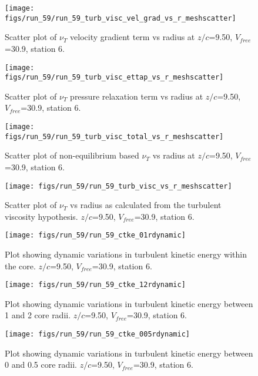 \begin{figure}[H]
\centering
\texttt{[image: figs/run\_59/run\_59\_turb\_visc\_vel\_grad\_vs\_r\_meshscatter]}
\caption{Scatter plot of $\nu_T$ velocity gradient term vs radius at $z/c$=9.50, $V_{free}$=30.9, station 6.}
\end{figure}


\begin{figure}[H]
\centering
\texttt{[image: figs/run\_59/run\_59\_turb\_visc\_ettap\_vs\_r\_meshscatter]}
\caption{Scatter plot of $\nu_T$ pressure relaxation term vs radius at $z/c$=9.50, $V_{free}$=30.9, station 6.}
\end{figure}


\begin{figure}[H]
\centering
\texttt{[image: figs/run\_59/run\_59\_turb\_visc\_total\_vs\_r\_meshscatter]}
\caption{Scatter plot of non-equilibrium based $\nu_T$ vs radius at $z/c$=9.50, $V_{free}$=30.9, station 6.}
\end{figure}


\begin{figure}[H]
\centering
\texttt{[image: figs/run\_59/run\_59\_turb\_visc\_vs\_r\_meshscatter]}
\caption{Scatter plot of $\nu_T$ vs radius as calculated from the turbulent viscosity hypothesis. $z/c$=9.50, $V_{free}$=30.9, station 6.}
\end{figure}


\begin{figure}[H]
\centering
\texttt{[image: figs/run\_59/run\_59\_ctke\_01rdynamic]}
\caption{Plot showing dynamic variations in turbulent kinetic energy within the core. $z/c$=9.50, $V_{free}$=30.9, station 6.}
\end{figure}


\begin{figure}[H]
\centering
\texttt{[image: figs/run\_59/run\_59\_ctke\_12rdynamic]}
\caption{Plot showing dynamic variations in turbulent kinetic energy between 1 and 2 core radii. $z/c$=9.50, $V_{free}$=30.9, station 6.}
\end{figure}


\begin{figure}[H]
\centering
\texttt{[image: figs/run\_59/run\_59\_ctke\_005rdynamic]}
\caption{Plot showing dynamic variations in turbulent kinetic energy between 0 and 0.5 core radii. $z/c$=9.50, $V_{free}$=30.9, station 6.}
\end{figure}



